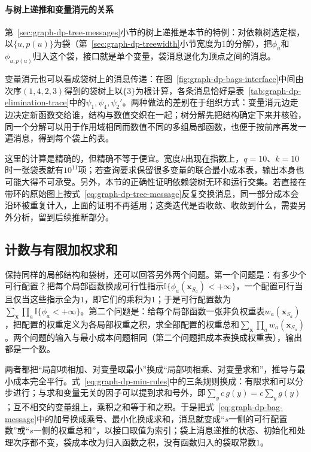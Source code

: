 \paragraph{与树上递推和变量消元的关系}
第~\ref{sec:graph-dp-tree-messages}小节的树上递推是本节的特例：对依赖树选定根，以$\{u,p(u)\}$为袋（第~\ref{sec:graph-dp-treewidth}小节宽度为$1$的分解），把$\phi_u$和$\phi_{u,p(u)}$归入这个袋，接口就是单个变量，袋消息退化为顶点之间的消息。

变量消元也可以看成袋树上的消息传递：在图~\ref{fig:graph-dp-bags-interface}中间由次序$(1,4,2,3)$得到的袋树上以$\{3\}$为根计算，各条消息恰好是表~\ref{tab:graph-dp-elimination-trace}中的$\psi_1,\psi_4,\psi_2'$。两种做法的差别在于组织方式：变量消元边走边决定新函数交给谁，结构与数值交织在一起；树分解先把结构确定下来并核验，同一个分解可以用于作用域相同而数值不同的多组局部函数，也便于按前序再发一遍消息，得到每个袋上的表。

这里的计算是精确的，但精确不等于便宜。宽度$k$出现在指数上，$q=10$、$k=10$时一张袋表就有$10^{11}$项；若查询要求保留很多变量的联合最小成本表，输出本身也可能大得不可承受。另外，本节的正确性证明依赖袋树无环和运行交集。若直接在带环的原始图上按式~\eqref{eq:graph-dp-tree-message}反复交换消息，同一部分成本会沿环被重复计入，上面的证明不再适用；这类迭代是否收敛、收敛到什么，需要另外分析，留到后续推断部分。

\subsection{计数与有限加权求和}
\label{sec:graph-dp-semiring}

保持同样的局部结构和袋树，还可以回答另外两个问题。第一个问题是：有多少个可行配置？把每个局部函数换成可行性指示$\mathbb I\{\phi_a(\bm x_{S_a})<+\infty\}$，一个配置可行当且仅当这些指示全为$1$，即它们的乘积为$1$；于是可行配置数为$\sum_{\bm x}\prod_a\mathbb I\{\phi_a<+\infty\}$。第二个问题是：给每个局部函数一张非负权重表$w_a(\bm x_{S_a})$，把配置的权重定义为各局部权重之积，求全部配置的权重总和$\sum_{\bm x}\prod_a w_a(\bm x_{S_a})$。两个问题的输入与最小成本问题相同（第二个问题把成本表换成权重表），输出都是一个数。

两者都把“局部项相加、对变量取最小”换成“局部项相乘、对变量求和”，推导与最小成本完全平行。式~\eqref{eq:graph-dp-min-rules}中的三条规则换成：有限求和可以分步进行；与求和变量无关的因子可以提到求和号外，即$\sum_y c\,g(y)=c\sum_y g(y)$；互不相交的变量组上，乘积之和等于和之积。于是把式~\eqref{eq:graph-dp-bag-message}中的加号换成乘号、最小化换成求和，消息就变成“$s$一侧的可行配置数”或“$s$一侧的权重总和”，以接口取值为索引；袋上消息递推的状态、初始化和处理次序都不变，袋成本改为归入函数之积，没有函数归入的袋取常数$1$。


